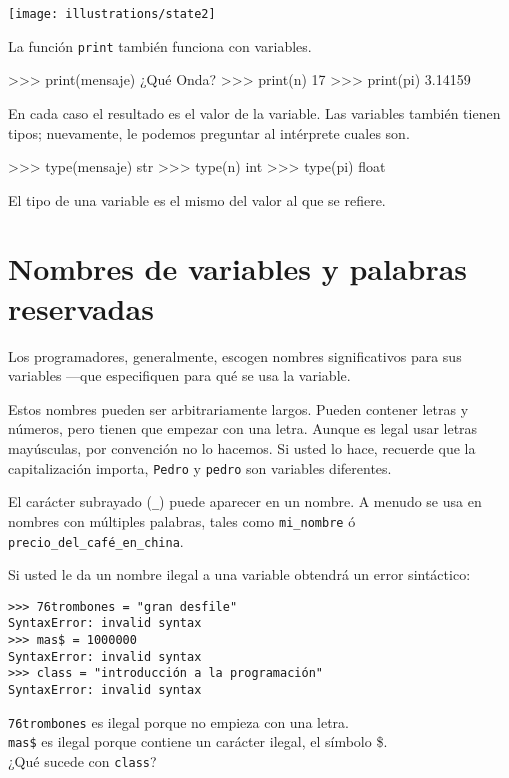 \beforefig \centerline{\texttt{[image: illustrations/state2]}}
\afterfig

La función \texttt{print} también funciona con variables.

\begin{pyconcode}
>>> print(mensaje)
¿Qué Onda?
>>> print(n)
17
>>> print(pi)
3.14159
\end{pyconcode}
 

En cada caso el resultado es el valor de la variable. Las variables
también tienen tipos; nuevamente, le podemos preguntar al intérprete
cuales son.

\begin{pyconcode}
>>> type(mensaje)
str
>>> type(n)
int
>>> type(pi)
float
\end{pyconcode}
 

El tipo de una variable es el mismo del valor al que se refiere.

\section{Nombres de variables y palabras reservadas}

 

Los programadores, generalmente, escogen nombres significativos para
sus variables —que especifiquen para qué se usa la variable.

Estos nombres pueden ser arbitrariamente largos. Pueden contener letras
y números, pero tienen que empezar con una letra. Aunque es legal
usar letras mayúsculas, por convención no lo hacemos. Si usted lo
hace, recuerde que la capitalización importa, \texttt{Pedro} y \texttt{pedro}
son variables diferentes.

El carácter subrayado (\texttt{\_}) puede aparecer en un nombre. A
menudo se usa en nombres con múltiples palabras, tales como \texttt{mi\_nombre}
ó \texttt{precio\_del\_café\_en\_china}.


Si usted le da un nombre ilegal a una variable obtendrá un error sintáctico:

\begin{lstlisting}
>>> 76trombones = "gran desfile"
SyntaxError: invalid syntax
>>> mas$ = 1000000
SyntaxError: invalid syntax
>>> class = "introducción a la programación"
SyntaxError: invalid syntax
\end{lstlisting}

\texttt{76trombones} es ilegal porque no empieza con una letra.\\
\texttt{mas\$} es ilegal porque contiene un carácter ilegal, el símbolo
\$.\\
¿Qué sucede con \texttt{class}?

